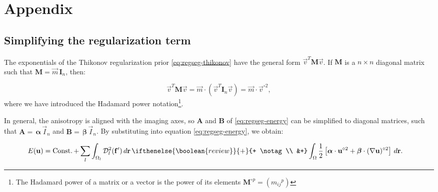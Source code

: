 \renewcommand{\theequation}{A.\arabic{equation}}
\renewcommand{\thesubsection}{Appendix \arabic{subsection}}

\section*{Appendix}

\subsection{Simplifying the regularization term}\label{app:reg_term}
The exponentials of the Thikonov regularization prior \eqref{eq:regseg-thikonov} have the general form
  $\vec{v}^T \mathbf{M} \vec{v}$.
If $\mathbf{M}$ is a $n \times n$ diagonal matrix such that $\mathbf{M} = \vec{m} \, \mathbf{I}_n$,
  then:

\begin{equation*}
\vec{v}^T \mathbf{M} \vec{v} = \vec{m} \cdot (\vec{v}^T \mathbf{I}_n \vec{v}) = \vec{m} \cdot \vec{v}^{\circ2},
\end{equation*}
  where we have introduced the Hadamard power notation\footnote{The Hadamard power of a matrix or a vector
  is the power of its elements $\mathbf{M}^{\circ p} = ({m_{ij}}^{p})$}.

In general, the anisotropy is aligned with the imaging axes, so
  $\mathbf{A}$ and $\mathbf{B}$ of \eqref{eq:regseg-energy} can be simplified to diagonal matrices, such that
  $\mathbf{A}= \, \boldsymbol{\alpha}\,\vec{I}_n$ and
  $\mathbf{B}= \, \boldsymbol{\beta}\,\vec{I}_n$.
By substituting into equation \eqref{eq:regseg-energy}, we obtain:

  \begin{align}
  E(\vec{u}) &= \const + \, \underset{l}{\sum} \int_{\Omega_l} \mdist{f'}{l} \,d\vec{r} \,
  \ifthenelse{\boolean{review}}{+}{+ \notag\\ &+}
  \int_{\Omega} \frac12 \left[ \boldsymbol{\alpha} \cdot \vec{u}^{\circ2} + \boldsymbol{\beta} \cdot (\nabla \vec{u})^{\circ2} \right] \,d\vec{r}.
  \label{eq:regseg-app_energy}
  \end{align}